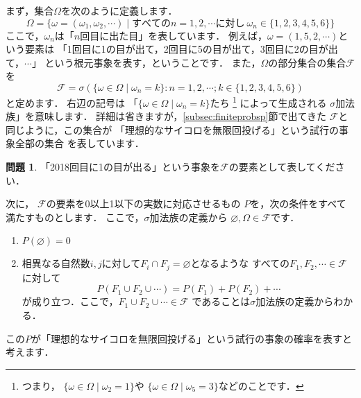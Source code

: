 \documentclass[./main]{subfiles} %
\theoremstyle{definition}
\newtheorem{hamadaqst}[hamadadefi]{問題}
\newtheorem{hamadaprop}[hamadadefi]{命題}
\begin{document}
まず，集合$\Omega$を次のように定義します．
\[ \Omega=\{\omega=(\omega_1,\omega_2,\cdots)\mid
すべてのn=1,2,\cdots に対し\ \omega_n\in\{1,2,3,4,5,6\}\} \]
ここで，$\omega_n$は「$n$回目に出た目」を表しています．
例えば，$\omega=(1,5,2,\cdots)$という要素は
「1回目に1の目が出て，2回目に5の目が出て，3回目に2の目が出て，$\cdots$」
という根元事象を表す，ということです．
また，$\Omega$の部分集合の集合$\mathcal{F}$を
\[ \mathcal{F}=\sigma(\{\omega\in\Omega\mid\omega_n=k\}
:n=1,2,\cdots;k\in\{1,2,3,4,5,6\}) \]
と定めます．
右辺の記号は
「$\{\omega\in\Omega\mid\omega_n=k\}$たち
\footnote{つまり，
$\{\omega\in\Omega\mid\omega_2=1\}$や
$\{\omega\in\Omega\mid\omega_5=3\}$などのことです．}
によって生成される
$\sigma$加法族」を意味します．
詳細は省きますが，\ref{subsec:finiteprobsp}節で出てきた
$\mathcal{F}$と同じように，この集合が
「理想的なサイコロを無限回投げる」という試行の事象全部の集合
を表しています．


\begin{hamadaqst}\label{checkofsigmaalgebra}
「2018回目に1の目が出る」という事象を$\mathcal{F}$の要素として表してください．
\end{hamadaqst}

次に，
$\mathcal{F}$の要素を0以上1以下の実数に対応させるもの
$P$を，次の条件をすべて満たすものとします．
ここで，$\sigma$加法族の定義から
$\varnothing,\Omega\in\mathcal{F}$です．
\begin{enumerate}
\item $P(\varnothing)=0$
\item 相異なる自然数$i,j$に対して$F_i\cap F_j=\varnothing$となるような
すべての$F_1,F_2,\cdots\in\mathcal{F}$に対して
\[ P(F_1\cup F_2\cup\cdots)=P(F_1)+P(F_2)+\cdots \]
が成り立つ．ここで，$F_1\cup F_2\cup\cdots\in\mathcal{F}$
であることは$\sigma$加法族の定義からわかる．
\end{enumerate}
この$P$が「理想的なサイコロを無限回投げる」という試行の事象の確率を表すと考えます．
\end{document}
